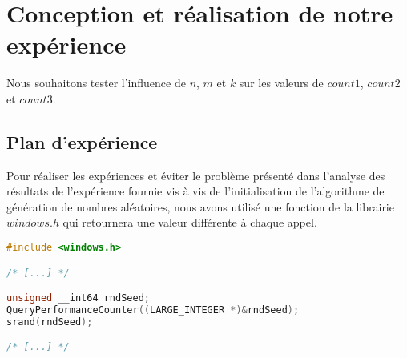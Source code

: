 
\section{Conception et réalisation de notre expérience}
Nous souhaitons tester l'influence de $n$, $m$ et $k$ sur les valeurs de $count1$, $count2$ et $count3$.

\subsection{Plan d'expérience}


Pour réaliser les expériences et éviter le problème présenté dans l'analyse des résultats de l'expérience fournie vis à vis de l'initialisation de l'algorithme de génération de nombres aléatoires, nous avons utilisé une fonction de la librairie $windows.h$ qui retournera une valeur différente à chaque appel.

\begin{lstlisting}[language=C]
#include <windows.h>

/* [...] */

unsigned __int64 rndSeed;
QueryPerformanceCounter((LARGE_INTEGER *)&rndSeed);
srand(rndSeed);

/* [...] */
\end{lstlisting}


